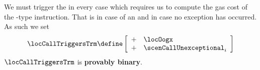 We must trigger the \trmMod{} in every case which requires us to compute the gas cost of the -type instruction. That is in case of an \oogxSH{} and in case no exception has occurred. As such we set 
\[
	\locCallTriggersTrm
	\define
	\left[ \begin{array}{cl}
		+ & \locOogx                    \\
		+ & \scenCallUnexceptional _{i} \\
	\end{array} \right]
\]
\saNote{}
$\locCallTriggersTrm$ is \textbf{provably binary}.
